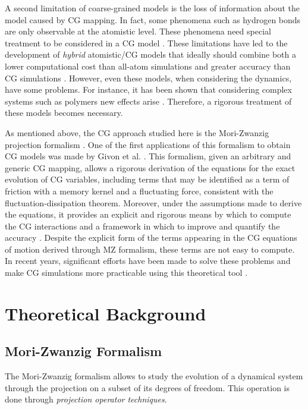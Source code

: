 \documentclass[10pt,a4paper]{book}
\theoremstyle{definition}
\begin{document}
A second limitation of coarse-grained models is the loss of information about the model caused by CG mapping. In fact, some phenomena such as hydrogen bonds are only observable at the atomistic level. These phenomena need special treatment to be considered in a CG model \cite{Karimi-Varzaneh2008}. These limitations have led to the development of \emph{hybrid} atomistic/CG models that ideally should combine both a lower computational cost than all-atom simulations and greater accuracy than CG simulations \cite{DiPasquale2012,Rzepiela2011}.
However, even these models, when considering the dynamics, have some problems. For instance, it has been shown that considering complex systems such as polymers new effects arise \cite{DiPasquale2017}. Therefore, a rigorous treatment of these models becomes necessary.

As mentioned above, the CG approach studied here is the Mori-Zwanzig projection formalism \cite{Mori1965,Zwanzig1973}. One of the first applications of this formalism to obtain CG models was made by Givon et al. \cite{Givon2004}. This formalism, given an arbitrary and generic CG mapping, allows a rigorous derivation of the equations for the exact evolution of CG variables, including terms that may be identified as a term of friction with a memory kernel and a fluctuating force, consistent with the fluctuation-dissipation theorem. Moreover, under the assumptions made to derive the equations, it provides an explicit and rigorous means by which to compute the CG interactions and a framework in which to improve and quantify the accuracy \cite{DiPasquale2019}.
Despite the explicit form of the terms appearing in the CG equations of motion derived through MZ formalism, these terms are not easy to compute. In recent years, significant efforts have been made to solve these problems and make CG simulations more practicable using this theoretical tool \cite{DiPasquale2019,Espanol2009,Hijon2010,Izvekov2017,Jung2017,Li2015,Wang2019,Yuanran2018}.



\part{Theoretical Background}

\chapter{Mori-Zwanzig Formalism}
The Mori-Zwanzig formalism allows to study the evolution of a dynamical system through the projection on a subset of its degrees of freedom. This operation is done through \emph{projection operator techniques}.
\end{document}
